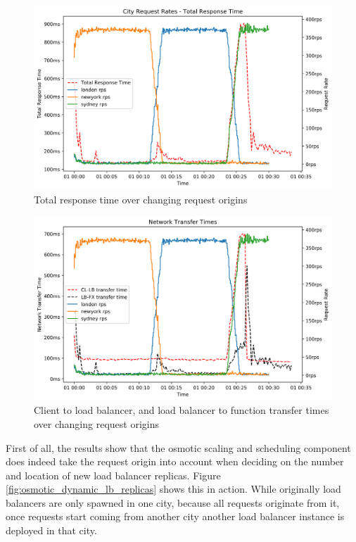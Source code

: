\begin{figure}
    \centering
    \includegraphics[width=14cm]{graphics/graphs/osmotic_dynamc_region_rps_trt.png}
    \caption{Total response time over changing request origins}
    \label{fig:osmotic_dynamic_trt}
\end{figure}

\begin{figure}
    \centering
    \includegraphics[width=14cm]{graphics/graphs/osmotic_dynamic_region_tx_times.png}
    \caption{Client to load balancer, and load balancer to function transfer times over changing request origins}
    \label{fig:osmotic_dynamic_tx}
\end{figure}

First of all, the results show that the osmotic scaling and scheduling component does indeed take the request origin into account when deciding on the number and location of new load balancer replicas.
Figure \ref{fig:osmotic_dynamic_lb_replicas} shows this in action.
While originally load balancers are only spawned in one city, because all requests originate from it, once requests start coming from another city another load balancer instance is deployed in that city.

